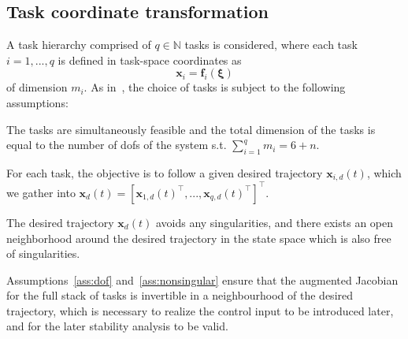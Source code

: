 \documentclass[../main.tex]{subfiles}
\begin{document}
\subsection{Task coordinate transformation}\label{ssec:hierarchy}\vspace{-9pt}
A task hierarchy comprised of $q \in \mathbb{N}$ tasks is considered, where each task $i=1,...,q$ is defined in task-space coordinates as
\begin{equation}
    \bm{x}_i = \bm{f}_i (\bm{\xi})
\end{equation}
of dimension $m_i$. As in~\cite{Dietrich2020}, the choice of tasks is subject to the following assumptions:
\begin{assumption}\label{ass:dof}
    The tasks are simultaneously feasible and the total dimension of the tasks is equal to the number  of \glspl{dof} of the system s.t. $\sum_{i=1}^{q} m_i = 6+n$.
\end{assumption}

For each task, the objective is to follow a given desired trajectory $\bm{x}_{i,d}(t)$, which we gather into $\bm{x}_d(t) = [ \bm{x}_{1,d}(t)^\top, ..., \bm{x}_{q,d}(t)^\top ]^\top$.
\begin{assumption}\label{ass:nonsingular}
    The desired trajectory $\bm{x}_d(t)$ avoids any singularities, and there exists an open neighborhood around the desired trajectory in the state space which is also free of singularities.
\end{assumption}

Assumptions~\ref{ass:dof} and~\ref{ass:nonsingular} ensure that the augmented Jacobian for the full stack of tasks is invertible in a neighbourhood of the desired trajectory, which is necessary to realize the control input to be introduced later, and for the later stability analysis to be valid.
%
\end{document}
